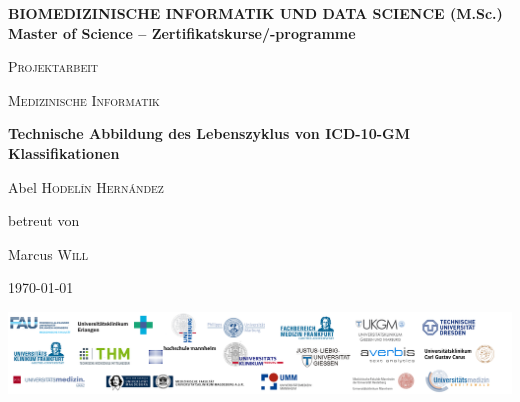 \begin{titlepage}
		\thispagestyle{firstpage}
		\raggedright
		{{\normalsize \color{orange} \bfseries BIOMEDIZINISCHE INFORMATIK UND DATA SCIENCE (M.Sc.) \\}
		{\normalsize \color{gray} \bfseries Master of Science – Zertifikatskurse/-programme}
			\par}
		\vspace{1cm}
		\centering
		{\scshape\LARGE Projektarbeit\par} 
		{\scshape\Large Medizinische Informatik\par}
		\vspace{1.5cm}
		{\huge \bfseries Technische Abbildung des Lebenszyklus von ICD-10-GM Klassifikationen\par}
		\vspace{2cm}
		{\Large Abel \textsc{Hodel\'in Hern\'andez}~\par}
		\vspace{2cm} 
		betreut von\par
		{Marcus \textsc{Will}\par}
		\vspace{2cm}				
		{\large \today\par}
		\vfill
		\includegraphics[width=\textwidth]{figures/onder_document.png}
	
	\end{titlepage}
